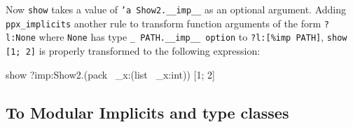 \documentclass{article}
\newenvironment{Shaded}{}{}
\newcommand{\NormalTok}[1]{{#1}}
\begin{document}
Now \texttt{show} takes a value of \texttt{'a Show2.\_\_imp\_\_} as an
optional argument. Adding \texttt{ppx\_implicits} another rule to
transform function arguments of the form \texttt{?l:None} where
\texttt{None} has type \texttt{\_ PATH.\_\_imp\_\_ option} to
\texttt{?l:{[}\%imp PATH{]}}, \texttt{show {[}1; 2{]}} is properly
transformed to the following expression:

\begin{Shaded}
\begin{Highlighting}[]
  \NormalTok{show ?imp:Show2.(pack ~_x:(}\NormalTok{list} \NormalTok{~_x:int)) [1; 2]}
\end{Highlighting}
\end{Shaded}

% 
% 
% 
% 

\subsection{To Modular Implicits and type
classes}\label{to-modular-implicits-and-type-classes}
\end{document}
